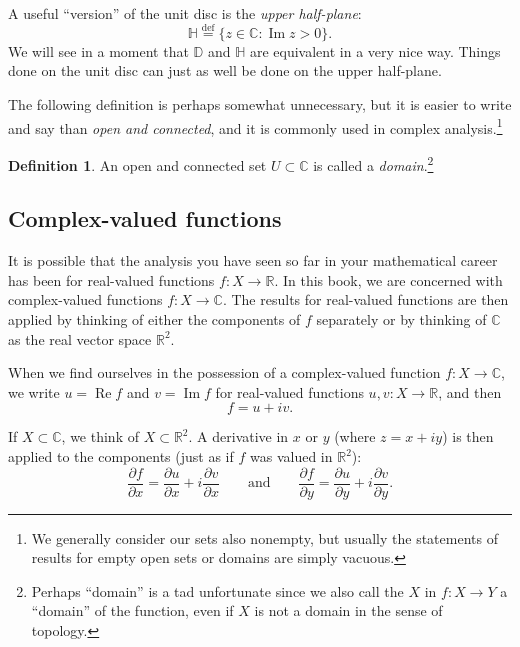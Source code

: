 \documentclass[12pt,openany]{book}
\renewcommand{\Re}{\operatorname{Re}}
\renewcommand{\Im}{\operatorname{Im}}
\newcommand{\C}{{\mathbb{C}}}
\newcommand{\R}{{\mathbb{R}}}
\newcommand{\D}{{\mathbb{D}}}
\newcommand{\bH}{{\mathbb{H}}}
\newcommand{\myindex}[1]{#1\index{#1}}
\newcommand{\myquote}[1]{``#1''}
\theoremstyle{plain}
\theoremstyle{remark}
\theoremstyle{definition}
\newtheorem{defn}[thm]{Definition}
\theoremstyle{exercise}
\theoremstyle{example}
\begin{document}
A useful \myquote{version} of the unit disc is the \emph{\myindex{upper half-plane}}:
%
\begin{equation*}
\bH 
\overset{\text{def}}{=}
\bigl\{
z \in \C : \Im z > 0
\bigr\} .
\end{equation*}
We will see in a moment that $\D$ and $\bH$ are equivalent in a
very nice way.
Things done on the unit disc can just as well be done on the upper half-plane.

The following definition is perhaps somewhat unnecessary, but it is 
easier to write and say than \emph{open and connected}, and it is commonly
used in complex analysis.\footnote{We generally consider our sets
also nonempty, but usually the statements of results for empty open sets or
domains are simply vacuous.}

\begin{defn}
An open and connected set $U \subset \C$ is called a
\emph{\myindex{domain}}.\footnote{Perhaps \myquote{domain} is a tad unfortunate since
we also call the $X$ in $f \colon X \to Y$ a \myquote{domain} of the function,
even if $X$ is not a domain in the sense of topology.}
\end{defn}

\subsection{Complex-valued functions}

It is possible that the analysis you have seen so far in your mathematical
career has been for real-valued functions $f \colon X \to \R$.  In this
book, we are concerned with complex-valued functions $f \colon X \to \C$.
The results for real-valued functions are then applied by thinking of
either the components of $f$ separately or by thinking of $\C$ as the
real vector space $\R^2$.

When we find ourselves in the possession of a complex-valued function
$f \colon X \to \C$, we write $u = \Re f$
and $v = \Im f$ for real-valued functions $u,v \colon X \to \R$, and then
\begin{equation*}
f = u+iv .
\end{equation*}

If $X \subset \C$, we think of $X \subset \R^2$.
A derivative in $x$ or $y$ (where $z=x+iy$) is then applied to the
components (just as if $f$ was valued in $\R^2$):
\begin{equation*}
\frac{\partial f}{\partial x} = 
\frac{\partial u}{\partial x} + i
\frac{\partial v}{\partial x}
\qquad\text{and}\qquad
\frac{\partial f}{\partial y} = 
\frac{\partial u}{\partial y} + i
\frac{\partial v}{\partial y} .
\end{equation*}
\end{document}
